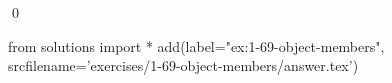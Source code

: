 
\begin{ex}
  \label{ex:1-69-object-members}
  
  \qed
\end{ex}
\begin{python0}
from solutions import *
add(label="ex:1-69-object-members",
    srcfilename='exercises/1-69-object-members/answer.tex')
\end{python0}
